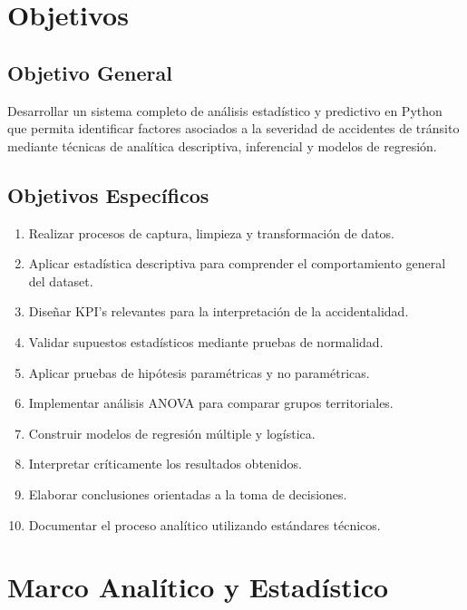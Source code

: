 \documentclass[11pt,a4paper]{article}
\begin{document}
\section{Objetivos}

\subsection*{Objetivo General}

Desarrollar un sistema completo de análisis estadístico y predictivo en Python que permita
identificar factores asociados a la severidad de accidentes de tránsito mediante técnicas de
analítica descriptiva, inferencial y modelos de regresión.

\subsection*{Objetivos Específicos}

\begin{enumerate}[leftmargin=*]
  \item Realizar procesos de captura, limpieza y transformación de datos.
  \item Aplicar estadística descriptiva para comprender el comportamiento general del
        dataset.
  \item Diseñar KPI's relevantes para la interpretación de la accidentalidad.
  \item Validar supuestos estadísticos mediante pruebas de normalidad.
  \item Aplicar pruebas de hipótesis paramétricas y no paramétricas.
  \item Implementar análisis ANOVA para comparar grupos territoriales.
  \item Construir modelos de regresión múltiple y logística.
  \item Interpretar críticamente los resultados obtenidos.
  \item Elaborar conclusiones orientadas a la toma de decisiones.
  \item Documentar el proceso analítico utilizando estándares técnicos.
\end{enumerate}

\section{Marco Analítico y Estadístico}
\end{document}
